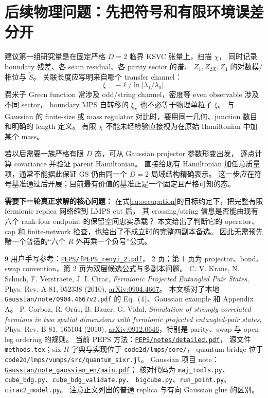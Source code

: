 \documentclass[11pt]{article}
\newcommand{\tS}{\widetilde S}
\newcommand{\code}[1]{\texttt{\small #1}}
\begin{document}
\section{后续物理问题：先把符号和有限环境误差分开}

建议第一组研究量是在固定严格 $D=2$ 临界 KSVC 张量上，扫描 $\chi$，
同时记录 boundary 残差、各 seam residual、各 parity sector 的谱、
$Z_1,Z_{2X},Z_4$ 的对数模/相位与 $\tS$。
关联长度应写明来自哪个 transfer channel：
\begin{equation}
 \xi=-\ell\big/\ln|\lambda_1/\lambda_0|.
\end{equation}
费米子 Green function 常涉及 odd/string channel，密度等 even observable 涉及不同 sector，
boundary MPS 自转移的 $\xi_\chi$ 也不必等于物理单粒子 $\xi$。
与 Gaussian 的 finite-size 或 mass regulator 对比时，要用同一几何、junction 数目和明确的 length 定义。
有限 $\chi$ 不能未经检验直接视为在原始 Hamiltonian 中加某个 mass。

若以后需要一族严格有限 $D$ 态，可从 Gaussian projector 参数形变出发，
逐点计算 covariance 并验证 parent Hamiltonian。
直接给现有 Hamiltonian 加任意质量项，通常不能据此保证 GS 仍由同一个 $D=2$ 局域结构精确表示。
这一步应在符号基准通过后开展；目前最有价值的基准正是一个固定且严格可知的态。

\bigskip
\noindent\textbf{需要下一轮真正求解的核心问题：}
在式\eqref{eq:occupation}的目标约定下，把完整有限 fermionic replica 网络缩到 LMPS cut 后，
其 crossing/string 信息是否能由现有六个 rank-four endpoint 的保留空间忠实承载？
本文给出了判断它的 operator、cap 和 finite-network 检查，也给出了不成立时的完整四副本备选。
因此无需预先赌一个普适的“六个 $R$ 外再乘一个负号”公式。

\begin{thebibliography}{9}
 用户手写参考：\href{../../fPEPS_renyi_2.pdf}{\code{PEPS/fPEPS\_renyi\_2.pdf}}，
2 页；第 1 页为 projector、bond、swap convention，第 2 页为双层候选公式与多副本问题。
 C. V. Kraus, N. Schuch, F. Verstraete, J. I. Cirac,
\emph{Fermionic Projected Entangled Pair States}, Phys. Rev. A 81, 052338 (2010),
\href{https://arxiv.org/abs/0904.4667}{arXiv:0904.4667}。
本文核对了本地 \code{Gaussian/note/0904.4667v2.pdf} 的 Eq.~(4)、Gaussian example 和 Appendix A。
 P. Corboz, R. Orús, B. Bauer, G. Vidal,
\emph{Simulation of strongly correlated fermions in two spatial dimensions with fermionic projected entangled-pair states},
Phys. Rev. B 81, 165104 (2010),
\href{https://arxiv.org/abs/0912.0646}{arXiv:0912.0646}，特别是 parity、swap 与 open-leg ordering 的规则。
 当前 PEPS 方法：\href{../detailed.pdf}{\code{PEPS/notes/detailed.pdf}}，
源文件 \code{methods.tex}；six-$R$ 字典与实现位于 \code{code2d/lmps/core/}，
quantum bridge 位于 \code{code2d/lmps/vumps/src/quantum\_sixr.jl}。
 Gaussian 项目 note：
\href{../../../Gaussian/note_gaussian_en/main.pdf}{\code{Gaussian/note\_gaussian\_en/main.pdf}}；
核对代码为 \code{maj\_tools.py}、\code{cube\_bdg.py}、\code{cube\_bdg\_validate.py}、
\code{bigcube.py}、\code{run\_point.py}、\code{cirac2\_model.py}。
注意正文列出的普通 replica 与有向 Gaussian glue 的区别。
\end{thebibliography}
\end{document}
